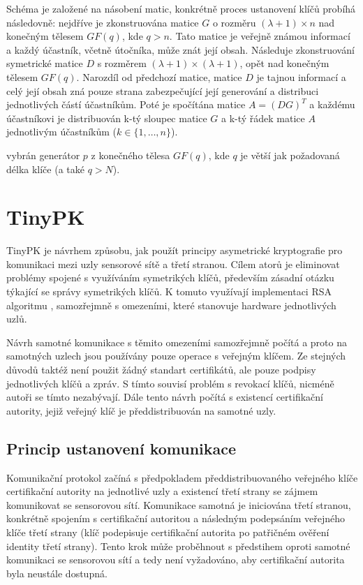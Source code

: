 \documentclass[11pt,final,twoside]{fithesis2}
\begin{document}
Schéma je založené na násobení matic, konkrétně proces ustanovení klíčů probíhá následovně: 
nejdříve je zkonstruována matice $G$ o rozměru $(\lambda + 1) \times n$ nad konečným tělesem $GF(q)$, kde $q > n$. Tato matice je veřejně známou informací a každý účastník, včetně útočníka, může znát 
její obsah. Následuje zkonstruování symetrické matice $D$ s rozměrem $(\lambda + 1) \times (\lambda + 1) $, opět nad konečným tělesem $GF(q)$. Narozdíl od předchozí matice, matice $D$ je tajnou informací
a celý její obsah zná pouze strana zabezpečující její generování a distribuci jednotlivých částí účastníkům. Poté je spočítána matice $A= (DG)^T$ a každému účastníkovi je distribuován k-tý sloupec 
matice $G$ a k-tý řádek matice $A$ jednotlivým účastníkům ($k \in \{1, \dots , n\}$). 





vybrán generátor $p$ z konečného tělesa $GF(q)$, kde $q$ je větší jak požadovaná délka klíče (a také $q > N$).




\section{TinyPK}
TinyPK \cite{Watro2004} je návrhem způsobu, jak použít principy asymetrické kryptografie 
pro komunikaci mezi uzly sensorové sítě a třetí stranou. Cílem atorů je eliminovat problémy spojené s využíváním 
symetrikých klíčů, především zásadní otázku týkající se správy symetrikých klíčů. K tomuto využívají
implementaci RSA algoritmu \cite{Rivest1978}, samozřejmně s omezeními, které stanovuje hardware jednotlivých uzlů.

Návrh samotné komunikace s těmito omezeními samozřejmně počítá a proto na samotných uzlech jsou používány
pouze operace s veřejným klíčem. Ze stejných důvodů taktéž není použit žádný standart certifikátů, ale 
pouze podpisy jednotlivých klíčů a zpráv. S tímto souvisí problém s revokací klíčů, nicméně autoři se tímto nezabývají.
Dále tento návrh počítá s existencí certifikační autority, jejiž veřejný klíč je předdistribuován na samotné uzly. 

\subsection{Princip ustanovení komunikace}
Komunikační protokol začíná s předpokladem předdistribuovaného veřejného klíče certifikační autority na jednotlivé
uzly a existencí třetí strany se zájmem komunikovat se sensorovou sítí. Komunikace samotná je iniciována třetí
stranou, konkrétně spojením s certifikační autoritou a následným podepsáním veřejného klíče třetí strany (klíč podepisuje 
certifikační autorita po patřičném ověření identity třetí strany). Tento krok může proběhnout s předstihem oproti samotné 
komunikaci se sensorovou sítí a tedy není vyžadováno, aby certifikační autorita byla neustále dostupná. 
\end{document}
